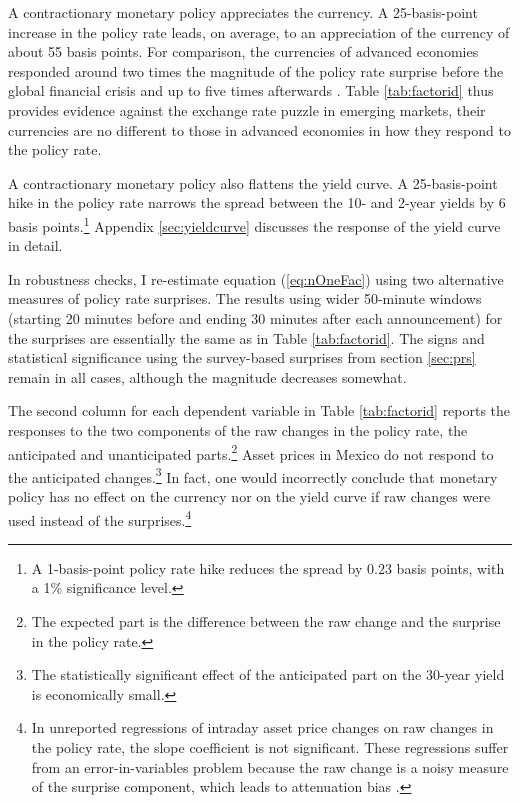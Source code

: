\documentclass[a4paper,12pt]{article} 		%
\begin{document}
A contractionary monetary policy appreciates the currency. A 25-basis-point increase in the policy rate leads, on average, to an appreciation of the currency of about 55 basis points. For comparison, the currencies of advanced economies responded around two times the magnitude of the policy rate surprise before the global financial crisis \parencite{Rosa:2011JBF} and up to five times afterwards \parencite{Wright:2012,FerrariKearnsSchrimpf:2021}. Table \ref{tab:factorid} thus provides evidence against the exchange rate puzzle in emerging markets, their currencies are no different to those in advanced economies in how they respond to the policy rate.

A contractionary monetary policy also flattens the yield curve. A 25-basis-point hike in the policy rate narrows the spread between the 10- and 2-year yields by 6 basis points.\footnote{A 1-basis-point policy rate hike reduces the spread by \(0.23\) basis points, with a 1\% significance level.} 
Appendix \ref{sec:yieldcurve} discusses the response of the yield curve in detail. 

In robustness checks, I re-estimate equation (\ref{eq:nOneFac}) using two alternative measures of policy rate surprises. The results using wider 50-minute windows (starting 20 minutes before and ending 30 minutes after each announcement) for the surprises are essentially the same as in Table \ref{tab:factorid}. The signs and statistical significance using the survey-based surprises from section \ref{sec:prs} remain in all cases, although the magnitude decreases somewhat. 

The second column for each dependent variable in Table \ref{tab:factorid} reports the responses to the two components of the raw changes in the policy rate, the anticipated and unanticipated parts.\footnote{The expected part is the difference between the raw change and the surprise in the policy rate.} Asset prices in Mexico do not respond to the anticipated changes.\footnote{The statistically significant effect of the anticipated part on the 30-year yield is economically small.} In fact, one would incorrectly conclude that monetary policy has no effect on the currency nor on the yield curve if raw changes were used instead of the surprises.\footnote{In unreported regressions of intraday asset price changes on raw changes in the policy rate, the slope coefficient is not significant. These regressions suffer from an error-in-variables problem because the raw change is a noisy measure of the surprise component, which leads to attenuation bias \parencite{Kuttner:2001}.} 
\end{document}
